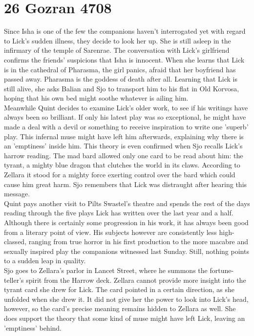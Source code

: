 \section{26 Gozran 4708}

Since Isha is one of the few the companions haven't interrogated yet with regard to Lick's sudden illness, they decide to look her up. She is still asleep in the infirmary of the temple of Sarenrae. The conversation with Lick's girlfriend confirms the friends' suspicions that Isha is innocent. When she learns that Lick is in the cathedral of Pharasma, the girl panics, afraid that her boyfriend has passed away. Pharasma is the goddess of death after all. Learning that Lick is still alive, she asks Balian and Sjo to transport him to his flat in Old Korvosa, hoping that his own bed might soothe whatever is ailing him.\\

Meanwhile Quint decides to examine Lick's older work, to see if his writings have always been so brilliant. If only his latest play was so exceptional, he might have made a deal with a devil or something to receive inspiration to write one 'superb' play. This infernal muse might have left him afterwards, explaining why there is an 'emptiness' inside him. This theory is even confirmed when Sjo recalls Lick's harrow reading. The mad bard allowed only one card to be read about him: the tyrant, a mighty blue dragon that clutches the world in its claws. According to Zellara it stood for a mighty force exerting control over the bard which could cause him great harm. Sjo remembers that Lick was distraught after hearing this message.\\

Quint pays another visit to Pilts Swastel's theatre and spends the rest of the days reading through the five plays Lick has written over the last year and a half. Although there is certainly some progression in his work, it has always been good from a literary point of view. His subjects however are consistently less high-classed, ranging from true horror in his first production to the more macabre and sexually inspired play the companions witnessed last Sunday. Still, nothing points to a sudden leap in quality.\\

Sjo goes to Zellara's parlor in Lancet Street, where he summons the fortune-teller's spirit from the Harrow deck. Zellara cannot provide more insight into the tyrant card she drew for Lick. The card pointed in a certain direction, as she unfolded when she drew it. It did not give her the power to look into Lick's head, however, so the card's precise meaning remains hidden to Zellara as well. She does support the theory that some kind of muse might have left Lick, leaving an 'emptiness' behind.\\

